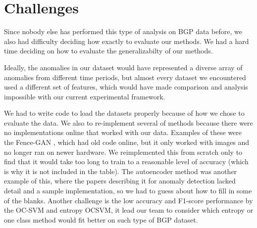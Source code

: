 \section{Challenges}


Since nobody else has performed this type of analysis on BGP data before, we also had difficulty deciding how exactly to evaluate our methods. We had a hard time deciding on how to evaluate the generalizabilty of our methods.

Ideally, the anomalies in our dataset would have represented a diverse array of anomalies from different time periods, but almost every dataset we encountered used a different set of features, which would have made comparison and analysis impossible with our current experimental framework.

We had to write code to load the datasets properly because of how we chose to evaluate the data. We also to re-implement several of methods because there were no implementations online that worked with our data. Examples of these were the Fence-GAN \cite{Ngo2019FenceDetection}, which had old code online, but it only worked with images and no longer ran on newer hardware. We reimplemented this from scratch only to find that it would take too long to train to a reasonable level of accuracy (which is why it is not included in the table). The autoencoder method was another example of this, where the papers describing it for anomaly detection lacked detail and a sample implementation, so we had to guess about how to fill in some of the blanks. Another challenge is the low accuracy and F1-score performance by the OC-SVM and entropy OCSVM, it lead our team to consider which entropy or one class method would fit better on such type of BGP dataset.


